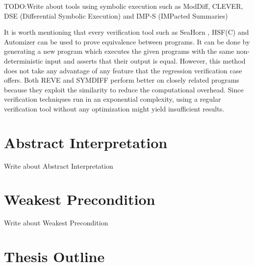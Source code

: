 TODO:Write about tools using symbolic execution such as ModDiff, CLEVER, DSE (Differential Symbolic Execution) and IMP-S (IMPacted Summaries)

It is worth mentioning that every verification tool such as SeaHorn \cite{DBLP:conf/cav/GurfinkelKKN15}, HSF(C) \cite{DBLP:conf/tacas/GrebenshchikovGLPR12} and Automizer \cite{DBLP:conf/cav/HeizmannHP13} can be used to prove equivalence between programs. It can be done by generating a new program which executes the given programs with the same non-deterministic input and asserts that their output is equal. However, this method does not take any advantage of any feature that the regression verification case offers. Both REVE and SYMDIFF perform better on closely related programs because they exploit the similarity to reduce the computational overhead. Since verification techniques run in an exponential complexity, using a regular verification tool without any optimization might yield insufficient results. 

\section{Abstract Interpretation}
Write about Abstract Interpretation

\section{Weakest Precondition}
\label{sec:wp}
Write about Weakest Precondition \cite{10.1145/360933.360975}

\section{Thesis Outline}

